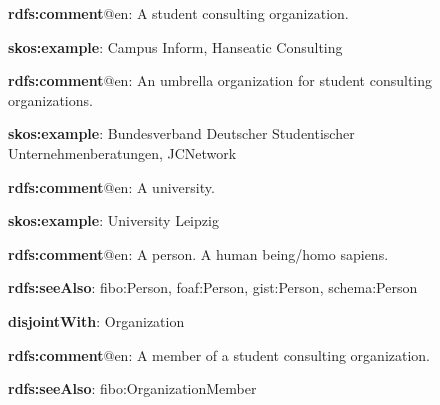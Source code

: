 \documentclass[a4paper, DIV=13, BCOR=0cm]{scrbook}
\begin{document}
\begin{mdframed}[style=onto-2, frametitle={Student Consulting Organization}]
	{%
		\begin{compactitem}
			\item \textbf{rdfs:comment}@en: A student consulting organization.
			\item \textbf{skos:example}: Campus Inform, Hanseatic Consulting
		\end{compactitem}
	} %
\end{mdframed}

\begin{mdframed}[style=onto-2, frametitle={Umbrella Organization}]
	{%
		\begin{compactitem}
			\item \textbf{rdfs:comment}@en: An umbrella organization for student consulting organizations.
			\item \textbf{skos:example}: Bundesverband Deutscher Studentischer Unternehmenberatungen, JCNetwork
		\end{compactitem}
	} %
\end{mdframed}

\begin{mdframed}[style=onto-2, frametitle={University}]
	{%
		\begin{compactitem}
			\item \textbf{rdfs:comment}@en: A university.
			\item \textbf{skos:example}: University Leipzig
		\end{compactitem}
	} %
\end{mdframed}

\begin{mdframed}[style=onto-1, frametitle={Person}]
	{%
		\begin{compactitem}
			\item \textbf{rdfs:comment}@en: A person. A human being/homo sapiens.
			\item \textbf{rdfs:seeAlso}: fibo:Person, foaf:Person, gist:Person, 
			schema:Person
			\item \textbf{disjointWith}: Organization
		\end{compactitem}
	} %
\end{mdframed}

\begin{mdframed}[style=onto-2, frametitle={Member}]
	{%
		\begin{compactitem}
			\item \textbf{rdfs:comment}@en: A member of a student consulting organization.
			\item \textbf{rdfs:seeAlso}: fibo:OrganizationMember
		\end{compactitem}
	} %
\end{mdframed}
\end{document}
